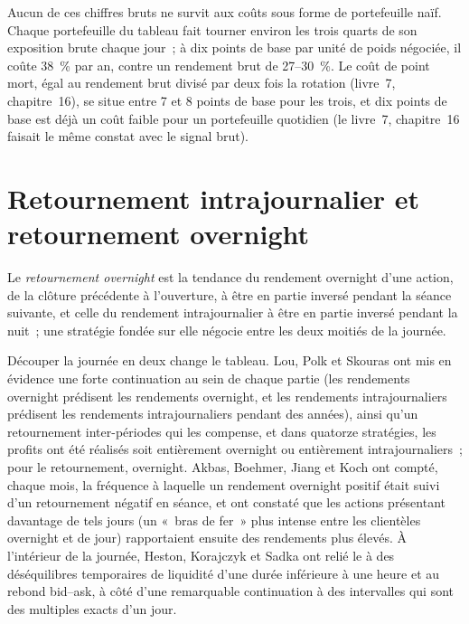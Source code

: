 Aucun de ces chiffres bruts ne survit aux coûts sous forme de portefeuille naïf. Chaque portefeuille du tableau fait tourner environ les trois quarts de son exposition brute chaque jour~; à dix points de base
par unité de poids négociée, il coûte 38~\% par an, contre un rendement brut de 27--30~\%. Le coût de point mort, égal au rendement brut divisé par deux fois la rotation (livre~7, chapitre~16),
se situe entre 7 et 8 points de base pour les trois, et dix points de base est déjà un coût faible pour un portefeuille quotidien (le livre~7, chapitre~16 faisait le même constat avec le signal brut).

\section{Retournement intrajournalier et retournement overnight}

\begin{definition}\label{def:s1:short-term-reversal:overnight}
Le \emph{retournement overnight} est la tendance du rendement overnight d'une action, de la clôture précédente à l'ouverture, à être en partie inversé
pendant la séance suivante, et celle du rendement intrajournalier à être en partie inversé pendant la nuit~; une stratégie fondée sur elle négocie entre les deux moitiés de la
journée.
\end{definition}

Découper la journée en deux change le tableau. Lou, Polk et Skouras ont mis en évidence une forte continuation au sein de chaque partie (les rendements overnight prédisent les rendements overnight, et
les rendements intrajournaliers prédisent les rendements intrajournaliers pendant des années), ainsi qu'un retournement inter-périodes qui les compense, et dans quatorze stratégies, les profits ont été réalisés soit
entièrement overnight ou entièrement intrajournaliers~; pour le retournement, overnight. Akbas, Boehmer, Jiang et Koch ont compté, chaque mois, la fréquence à laquelle un rendement overnight positif
était suivi d'un retournement négatif en séance, et ont constaté que les actions présentant davantage de tels jours (un «~bras de fer~» plus intense entre les clientèles
overnight et de jour) rapportaient ensuite des rendements plus élevés. À l'intérieur de la journée, Heston, Korajczyk et Sadka ont relié le  à des déséquilibres temporaires de liquidité d'une durée
inférieure à une heure et au rebond bid--ask, à côté d'une remarquable continuation à des intervalles qui sont des multiples exacts d'un jour.

